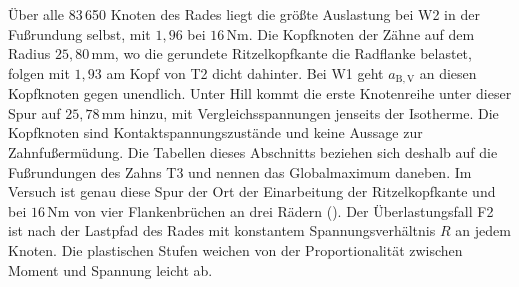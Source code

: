Über alle 83\,650 Knoten des Rades liegt die größte Auslastung bei W2 in der Fußrundung selbst, mit $1{,}96$ bei $16$\,Nm. Die Kopfknoten der Zähne auf dem Radius $25{,}80$\,mm, wo die gerundete Ritzelkopfkante die Radflanke belastet, folgen mit $1{,}93$ am Kopf von T2 dicht dahinter. Bei W1 geht $a_{\mathrm{B,V}}$ an diesen Kopfknoten gegen unendlich. Unter Hill kommt die erste Knotenreihe unter dieser Spur auf $25{,}78$\,mm hinzu, mit Vergleichsspannungen jenseits der Isotherme. Die Kopfknoten sind Kontaktspannungszustände und keine Aussage zur Zahnfußermüdung. Die Tabellen dieses Abschnitts beziehen sich deshalb auf die Fußrundungen des Zahns T3 und nennen das Globalmaximum daneben. Im Versuch ist genau diese Spur der Ort der Einarbeitung der Ritzelkopfkante und bei $16$\,Nm von vier Flankenbrüchen an drei Rädern (). Der Überlastungsfall F2 ist nach  der Lastpfad des Rades mit konstantem Spannungsverhältnis $R$ an jedem Knoten. Die plastischen Stufen weichen von der Proportionalität zwischen Moment und Spannung leicht ab.



